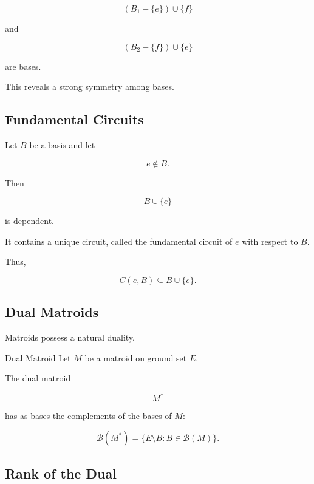 \[
(B_1-\{e\})\cup\{f\}
\]

and

\[
(B_2-\{f\})\cup\{e\}
\]

are bases.

This reveals a strong symmetry among bases.

\subsection{Fundamental Circuits}
\label{subsec:fundamental-circuits}

Let \(B\) be a basis and let

\[
e\notin B.
\]

Then

\[
B\cup\{e\}
\]

is dependent.

It contains a unique circuit, called the fundamental circuit of \(e\)
with respect to \(B\).

Thus,

\[
\boxed{
C(e,B)
\subseteq
B\cup\{e\}.
}
\]

\subsection{Dual Matroids}
\label{subsec:dual-matroids}

Matroids possess a natural duality.

\begin{definitionbox}{Dual Matroid}
Let \(M\) be a matroid on ground set \(E\).

The dual matroid

\[
\boxed{
M^*
}
\]

has as bases the complements of the bases of \(M\):

\[
\boxed{
\mathcal{B}(M^*)
=
\{
E\setminus B:
B\in\mathcal{B}(M)
\}.
}
\]
\end{definitionbox}

\subsection{Rank of the Dual}
\label{subsec:dual-rank}

